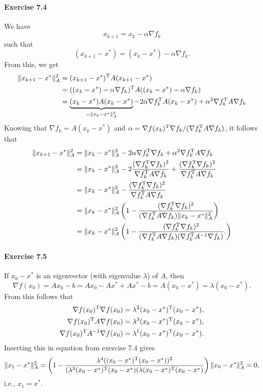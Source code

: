 \paragraph{Exercise 7.4} %
We have
\[
x_{k+1} = x_k - \alpha \nabla f_k
\]
such that
\[
(x_{k+1} - x^*) = (x_k-x^*) - \alpha \nabla f_k.
\]
From this, we get
\[
\begin{split}
\|x_{k+1} - x^*\|_A^2
&= (x_{k+1} - x^*)^{\text{\upshape T}} A (x_{k+1} - x^*)\\
&= ((x_{k} - x^*) - \alpha\nabla f_k)^{\text{\upshape T}} A ((x_k - x^*) - \alpha \nabla f_k)\\
&= \underbrace{(x_{k} - x^*) A (x_k - x^*)}_{=\|x_k-x^*\|_A^2} - 2\alpha\nabla f_k^{\text{\upshape T}} A(x_k-x^*) + \alpha^2\nabla f_k^{\text{\upshape T}} A \nabla f_k
\end{split}
\]
Knowing that $\nabla f_k=A(x_k - x^*)$ and $\alpha = \nabla
f(x_k)^{\text{\upshape T}}\nabla f_k/(\nabla f_k^{\text{\upshape T}} A\nabla f_k)$, it follows that
\[
\begin{split}
\|x_{k+1} - x^*\|_A^2
&= \|x_k - x^*\|_A^2  - 2\alpha \nabla f_k^{\text{\upshape T}} \nabla f_k + \alpha^2\nabla f_k^{\text{\upshape T}} A\nabla f_k\\
&= \|x_k - x^*\|_A^2
  - 2\frac{(\nabla f_k^{\text{\upshape T}} \nabla f_k)^2}{\nabla f_k^{\text{\upshape T}} A \nabla f_k}
  + \frac{(\nabla f_k^{\text{\upshape T}} \nabla f_k)^2}{\nabla f_k^{\text{\upshape T}} A \nabla f_k}\\
&= \|x_k - x^*\|_A^2
  - \frac{(\nabla f_k^{\text{\upshape T}} \nabla f_k)^2}{\nabla f_k^{\text{\upshape T}} A \nabla f_k}\\
&= \|x_k - x^*\|_A^2
\left(
1
- \frac{(\nabla f_k^{\text{\upshape T}} \nabla f_k)^2}{(\nabla f_k^{\text{\upshape T}} A \nabla f_k)\|x_k - x^*\|_A^2}
\right)\\
&= \|x_k - x^*\|_A^2
\left(
1
- \frac{(\nabla f_k^{\text{\upshape T}} \nabla f_k)^2}{(\nabla f_k^{\text{\upshape T}} A \nabla f_k)(\nabla f_k^{\text{\upshape T}} A^{-1} \nabla f_k)}.
\right)
\end{split}
\]

\paragraph{Exercise 7.5} %
If $x_0-x^*$ is an eigenvector (with eigenvalue $\lambda$) of $A$, then
\[
\nabla f(x_0)
= A x_0 - b
= A x_0 - A x^* + Ax^* -b
= A(x_0 - x^*)
= \lambda (x_0-x^*).
\]
From this follows that
\begin{align*}
\nabla f(x_0)^{\text{\upshape T}} \nabla f(x_0)       &= \lambda^2 (x_0-x^*)^{\text{\upshape T}} (x_0-x^*),\\
\nabla f(x_0)^{\text{\upshape T}} A\nabla f(x_0)      &= \lambda^3 (x_0-x^*)^{\text{\upshape T}} (x_0-x^*),\\
\nabla f(x_0)^{\text{\upshape T}} A^{-1}\nabla f(x_0) &= \lambda^1 (x_0-x^*)^{\text{\upshape T}} (x_0-x^*).
\end{align*}
Inserting this in equation from exercise 7.4 gives
\[
  \|x_{1} - x^*\|_A^2
  = \left(1 - \frac{\lambda^4 ((x_0-x^*)^{\text{\upshape T}}(x_0-x^*))^2}{(\lambda^3 (x_0-x^*)^{\text{\upshape T}}(x_0-x^*)(\lambda (x_0-x^*)^{\text{\upshape T}}(x_0-x^*)}\right)\|x_{0} - x^*\|_A^2
=0,
\]
i.e., $x_1 = x^*$.


